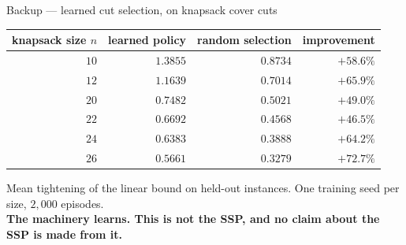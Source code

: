\documentclass[11pt,aspectratio=169]{beamer}
\newcommand{\keyline}[1]{\vspace{0.4em}{\color{cRule}\rule{\textwidth}{0.4pt}}\vspace{0.3em}\par#1}
\begin{document}
\begin{frame}{Backup --- learned cut selection, on knapsack cover cuts}
\vspace{0.6em}
\centering
\begin{tabular}{@{}rrrr@{}}
\toprule
knapsack size $n$ & learned policy & random selection & improvement\\
\midrule
$10$ & $1.3855$ & $0.8734$ & $+58.6\%$\\
$12$ & $1.1639$ & $0.7014$ & $+65.9\%$\\
$20$ & $0.7482$ & $0.5021$ & $+49.0\%$\\
$22$ & $0.6692$ & $0.4568$ & $+46.5\%$\\
$24$ & $0.6383$ & $0.3888$ & $+64.2\%$\\
$26$ & $0.5661$ & $0.3279$ & $+72.7\%$\\
\bottomrule
\end{tabular}
\vspace{1.0em}
\keyline{}
\begin{center}
\small
Mean tightening of the linear bound on held-out instances. One training seed per size,
$2{,}000$ episodes.\\[0.4em]
\textbf{The machinery learns. This is not the SSP, and no claim about the SSP is made
from it.}
\end{center}
\end{frame}
\end{document}
